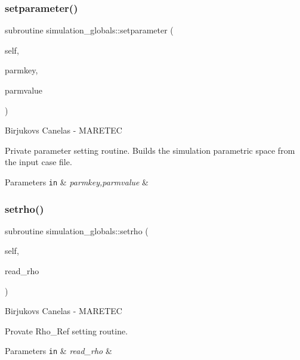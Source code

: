 \subsubsection{\texorpdfstring{setparameter()}{setparameter()}}
{\footnotesize\ttfamily subroutine simulation\+\_\+globals\+::setparameter (\begin{DoxyParamCaption}\item[{class(\mbox{\hyperlink{structsimulation__globals_1_1parameters__t}{parameters\+\_\+t}}), intent(inout)}]{self,  }\item[{type(string), intent(in)}]{parmkey,  }\item[{type(string), intent(in)}]{parmvalue }\end{DoxyParamCaption})\hspace{0.3cm}{\ttfamily [private]}}



Birjukovs Canelas -\/ M\+A\+R\+E\+T\+EC 

Private parameter setting routine. Builds the simulation parametric space from the input case file. 
\begin{DoxyParams}[1]{Parameters}
\mbox{\tt in}  & {\em parmkey,parmvalue} & \\
\hline
\end{DoxyParams}
\mbox{\label{namespacesimulation__globals_acfdc640757f0275bccb1d8de7bd7dc92}} 
\subsubsection{\texorpdfstring{setrho()}{setrho()}}
{\footnotesize\ttfamily subroutine simulation\+\_\+globals\+::setrho (\begin{DoxyParamCaption}\item[{class(\mbox{\hyperlink{structsimulation__globals_1_1constants__t}{constants\+\_\+t}}), intent(inout)}]{self,  }\item[{type(string), intent(in)}]{read\+\_\+rho }\end{DoxyParamCaption})\hspace{0.3cm}{\ttfamily [private]}}



Birjukovs Canelas -\/ M\+A\+R\+E\+T\+EC 

Provate Rho\+\_\+\+Ref setting routine. 
\begin{DoxyParams}[1]{Parameters}
\mbox{\tt in}  & {\em read\+\_\+rho} & \\
\hline
\end{DoxyParams}


